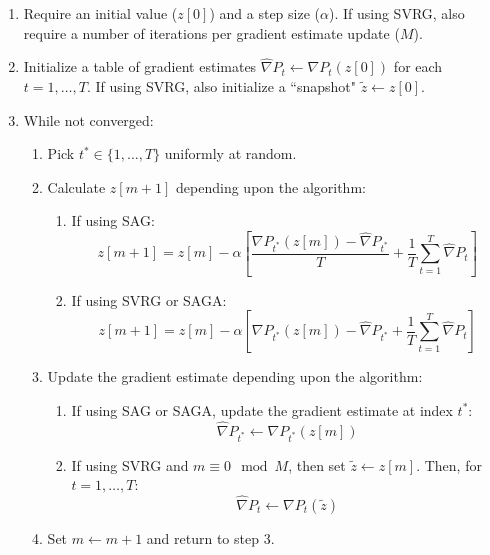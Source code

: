 \begin{enumerate}
    \item Require an initial value ($z[0]$) and a step size ($\alpha$). If using SVRG, also require a number of iterations per gradient estimate update ($M$).
    \item Initialize a table of gradient estimates $\widehat \nabla P_t \leftarrow \nabla P_t (z[0])$ for each $t = 1,\ldots,T$. If using SVRG, also initialize a ``snapshot" $\tilde z \leftarrow z[0]$.
    \item While not converged:
    \begin{enumerate}
        \item Pick $t^* \in \{1,\ldots,T\}$ uniformly at random.
        \item Calculate $z[m+1]$ depending upon the algorithm:
        \begin{enumerate}
            \item If using SAG:
            \begin{equation}
                z[m+1] = z[m] - \alpha \left[\frac{\nabla P_{t^*}(z[m]) - \widehat \nabla P_{t^*}}{T} + \frac{1}{T} \sum_{t=1}^T \widehat \nabla P_{t} \right] 
                \label{eqn:SAG_update}
            \end{equation}
            \item If using SVRG or SAGA:
            \begin{equation}
                z[m+1] = z[m] - \alpha \left[\nabla P_{t^*}(z[m]) - \widehat \nabla P_{t^*} + \frac{1}{T} \sum_{t=1}^T \widehat \nabla P_{t} \right]
                \label{eqn:SAGA_update}
            \end{equation}
        \end{enumerate}
        \item Update the gradient estimate depending upon the algorithm:
        \begin{enumerate}
            \item If using SAG or SAGA, update the gradient estimate at index $t^*$:
            \begin{equation}
                \widehat \nabla P_{t^*} \leftarrow \nabla P_{t^*}(z[m])
            \end{equation}
            \item If using SVRG and $m \equiv 0 \mod M$, then set $\tilde z \leftarrow z[m]$. Then, for $t = 1,\ldots,T$:
            \begin{equation}
                \widehat \nabla P_{t} \leftarrow \nabla P_{t}(\tilde z)
            \end{equation}
        \end{enumerate}
        \item Set $m \leftarrow m+1$ and return to step 3.
    \end{enumerate}
\end{enumerate}

